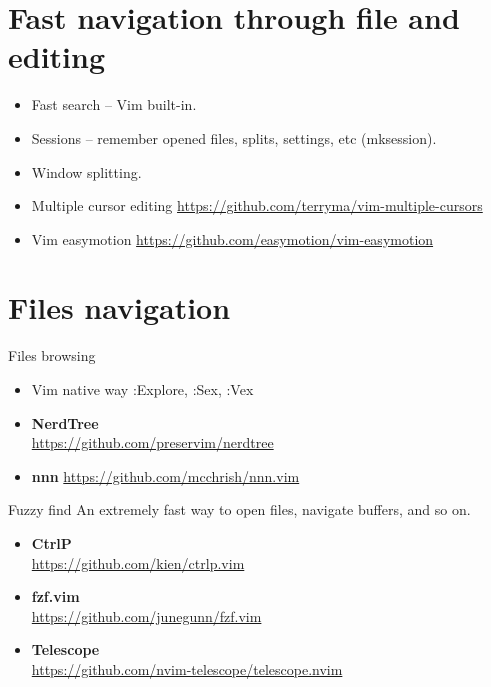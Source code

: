 \documentclass[aspectratio=169]{beamer}
\newcommand{\myurl}[1]{{\color{indigo}\url{#1}}}%
\begin{document}
\section*{Fast navigation through file and editing}
\begin{frame}{\secname}
  \begin{itemize}
    \item Fast search -- Vim built-in. 
    \item Sessions -- remember opened files, splits, settings, etc (mksession).
    \item Window splitting. 
    \item Multiple cursor editing \myurl{https://github.com/terryma/vim-multiple-cursors}
    \item Vim easymotion \myurl{https://github.com/easymotion/vim-easymotion}
  \end{itemize}
  	
\end{frame}

\section*{Files navigation}
\begin{frame}{\secname}

  \begin{block}{Files browsing}
    \begin{itemize}
      \item {Vim native way :Explore, :Sex, :Vex}
      \item {\bf NerdTree}\\ \myurl{https://github.com/preservim/nerdtree}
      \item \textbf{nnn} \myurl{https://github.com/mcchrish/nnn.vim}
    \end{itemize}
  \end{block}

  \begin{block}{Fuzzy find }
    An extremely fast way to open files, navigate buffers, and so on.
    \begin{itemize}
      \item {\bf CtrlP}\\ \myurl{https://github.com/kien/ctrlp.vim} 
      \item {\bf fzf.vim}\\ \myurl{https://github.com/junegunn/fzf.vim} 
      \item {\bf Telescope}\\ \myurl{https://github.com/nvim-telescope/telescope.nvim} 
    \end{itemize}
  \end{block}
    
\end{frame}
\end{document}
